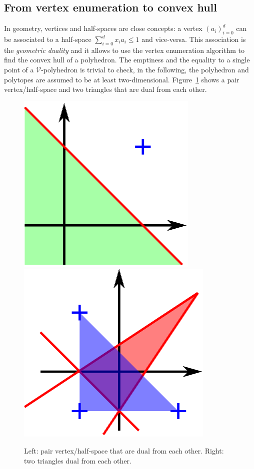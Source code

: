 \subsection{From vertex enumeration to convex hull}


In geometry, vertices and half-spaces are close concepts: a vertex $(a_i)_{i=0}^d$ can be associated to a half-space $\sum_{i=0}^d x_i a_i \leq 1$ and vice-versa. This association is the \emph{geometric duality} and it allows to use the vertex enumeration algorithm to find the convex hull of a polyhedron. The emptiness and the equality to a single point of a $\mathcal{V}$-polyhedron is trivial to check, in the following, the polyhedron and polytopes are assumed to be at least two-dimensional. Figure~\ref{ex_dual} shows a pair vertex/half-space and two triangles that are dual from each other.

\begin{figure}
\includegraphics[scale=1]{images/dual.eps}
\hspace*{1cm}
\includegraphics[scale=1]{images/dual4.eps}
\caption{Left: pair vertex/half-space that are dual from each other. Right: two triangles dual from each other.}
\label{ex_dual}
\vspace*{-0.7cm}
\end{figure}

